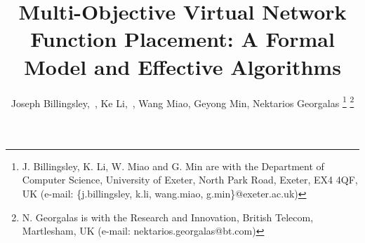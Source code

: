 \documentclass[journal]{IEEEtran}
\begin{document}
%
\title{Multi-Objective Virtual Network Function Placement: A Formal Model and Effective Algorithms}
%
%
\author{
	Joseph Billingsley,~,
	Ke Li,~,
	Wang Miao,
	Geyong Min,
	Nektarios Georgalas
	\thanks{J. Billingsley, K. Li, W. Miao and G. Min are with the Department of Computer Science, University of Exeter, North Park Road, Exeter, EX4 4QF, UK (e-mail: \{j.billingsley, k.li, wang.miao, g.min\}@exeter.ac.uk)}
	\thanks{N. Georgalas is with the Research and Innovation, British Telecom, Martlesham, UK (e-mail: nektarios.georgalas@bt.com)}
}

\maketitle
\end{document}
